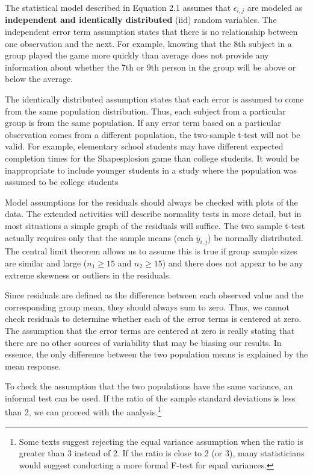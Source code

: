 \documentclass[
]{report}
\begin{document}
The statistical model described in Equation 2.1 assumes that \(\epsilon_{i, j}\) are modeled as \textbf{independent and identically distributed} (iid) random variables. The independent error term assumption states that there is no relationship between one observation and the next. For example, knowing that the 8th subject in a group played the game more quickly than average does not provide any information about whether the 7th or 9th person in the group will be above or below the average.

The identically distributed assumption states that each error is assumed to come from the same population distribution. Thus, each subject from a particular group is from the same population. If any error term
based on a particular observation comes from a different population, the two-sample t-test will not be valid. For example, elementary school students may have different expected completion times for the Shapesplosion game than college students. It would be inappropriate to include younger students in a study where the population was assumed to be college students

Model assumptions for the residuals should always be checked with plots of the data. The extended activities will describe normality tests in more detail, but in most situations a simple graph of the residuals will
suffice. The two sample t-test actually requires only that the sample means (each \(\bar{y}_{i,j}\)) be normally distributed. The central limit theorem allows us to assume this is true if group sample sizes are similar and large (\(n_1 \ge 15\) and \(n_2 \ge 15\)) and there does not appear to be any extreme skewness or outliers in the residuals.

Since residuals are defined as the difference between each observed value and the corresponding group mean, they should always sum to zero. Thus, we cannot check residuals to determine whether each of the error
terms is centered at zero. The assumption that the error terms are centered at zero is really stating that there are no other sources of variability that may be biasing our results. In essence, the only difference between the two population means is explained by the mean response.

To check the assumption that the two populations have the same variance, an informal test can be used. If the ratio of the sample standard deviations is less than 2, we can proceed with the analysis.\footnote{Some texts suggest rejecting the equal variance assumption when the ratio is greater than 3 instead of 2. If the ratio is close to 2 (or 3), many statisticians would suggest conducting a more formal F-test for equal variances.}
\end{document}
